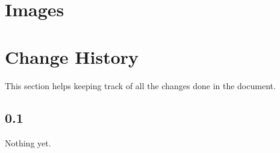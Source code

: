 \documentclass[10pt, a4paper, onecolumn]{article} %
\begin{document}
\newpage


\section{Images}

\newpage

\section{Change History}

This section helps keeping track of all the changes done in the document.\\

\subsection*{0.1}

Nothing yet.\\
\end{document}
